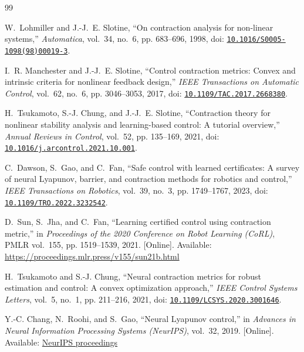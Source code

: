 \documentclass[12pt,onecolumn,journal]{IEEEtran}
\begin{document}
\begin{thebibliography}{99}
\small
\setlength{\baselineskip}{11.5pt}

W.~Lohmiller and J.-J.~E. Slotine,
``On contraction analysis for non-linear systems,''
\emph{Automatica}, vol.~34, no.~6, pp. 683--696, 1998, doi: \href{https://doi.org/10.1016/S0005-1098(98)00019-3}{\nolinkurl{10.1016/S0005-1098(98)00019-3}}.

I.~R. Manchester and J.-J.~E. Slotine,
``Control contraction metrics: Convex and intrinsic criteria for nonlinear feedback design,''
\emph{IEEE Transactions on Automatic Control}, vol.~62, no.~6, pp. 3046--3053, 2017, doi: \href{https://doi.org/10.1109/TAC.2017.2668380}{\nolinkurl{10.1109/TAC.2017.2668380}}.

H.~Tsukamoto, S.-J. Chung, and J.-J.~E. Slotine,
``Contraction theory for nonlinear stability analysis and learning-based control: A tutorial overview,''
\emph{Annual Reviews in Control}, vol.~52, pp. 135--169, 2021, doi: \href{https://doi.org/10.1016/j.arcontrol.2021.10.001}{\nolinkurl{10.1016/j.arcontrol.2021.10.001}}.

C.~Dawson, S.~Gao, and C.~Fan,
``Safe control with learned certificates: A survey of neural Lyapunov, barrier, and contraction methods for robotics and control,''
\emph{IEEE Transactions on Robotics}, vol.~39, no.~3, pp. 1749--1767, 2023, doi: \href{https://doi.org/10.1109/TRO.2022.3232542}{\nolinkurl{10.1109/TRO.2022.3232542}}.

D.~Sun, S.~Jha, and C.~Fan,
``Learning certified control using contraction metric,''
in \emph{Proceedings of the 2020 Conference on Robot Learning (CoRL)}, PMLR vol.~155, pp. 1519--1539, 2021. [Online]. Available: \url{https://proceedings.mlr.press/v155/sun21b.html}

H.~Tsukamoto and S.-J. Chung,
``Neural contraction metrics for robust estimation and control: A convex optimization approach,''
\emph{IEEE Control Systems Letters}, vol.~5, no.~1, pp. 211--216, 2021, doi: \href{https://doi.org/10.1109/LCSYS.2020.3001646}{\nolinkurl{10.1109/LCSYS.2020.3001646}}.

Y.-C. Chang, N.~Roohi, and S.~Gao,
``Neural Lyapunov control,''
in \emph{Advances in Neural Information Processing Systems (NeurIPS)}, vol.~32, 2019. [Online]. Available: \href{https://proceedings.neurips.cc/paper/2019/hash/2647c1dba23bc0e0f9cdf75339e120d2-Abstract.html}{NeurIPS proceedings}


\end{thebibliography}
\end{document}
